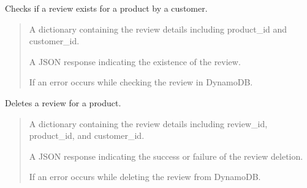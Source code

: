 \documentclass[letterpaper,10pt,english]{sphinxmanual}
\begin{document}
\begin{fulllineitems}
\label{\detokenize{routes_reviews:routes_reviews.route_check_review}}
\pysigstartsignatures
{}
\pysigstopsignatures
\sphinxAtStartPar
Checks if a review exists for a product by a customer.
\begin{quote}\begin{description}
\sphinxAtStartPar
{} \textendash{} A dictionary containing the review details including product\_id and customer\_id.

\sphinxAtStartPar
A JSON response indicating the existence of the review.

\sphinxAtStartPar
{} \textendash{} If an error occurs while checking the review in DynamoDB.

\end{description}\end{quote}

\end{fulllineitems}


\begin{fulllineitems}
\label{\detokenize{routes_reviews:routes_reviews.route_delete_review}}
\pysigstartsignatures
{}
\pysigstopsignatures
\sphinxAtStartPar
Deletes a review for a product.
\begin{quote}\begin{description}
\sphinxAtStartPar
{} \textendash{} A dictionary containing the review details including review\_id, product\_id, and customer\_id.

\sphinxAtStartPar
A JSON response indicating the success or failure of the review deletion.

\sphinxAtStartPar
{} \textendash{} If an error occurs while deleting the review from DynamoDB.

\end{description}\end{quote}

\end{fulllineitems}
\end{document}
